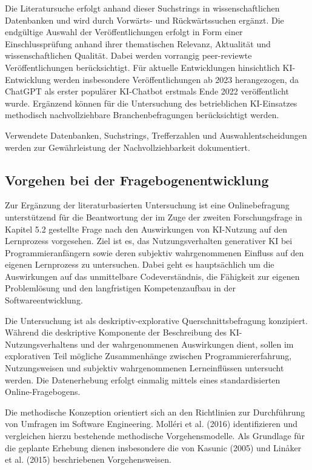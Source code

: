 Die Literatursuche erfolgt anhand dieser Suchstrings in wissenschaftlichen Datenbanken und wird durch Vorwärts- und Rückwärtssuchen ergänzt. Die endgültige Auswahl der Veröffentlichungen erfolgt in Form einer Einschlussprüfung anhand ihrer thematischen Relevanz, Aktualität und wissenschaftlichen Qualität. Dabei werden vorrangig peer-reviewte Veröffentlichungen berücksichtigt. Für aktuelle Entwicklungen hinsichtlich KI-Entwicklung werden insbesondere Veröffentlichungen ab 2023 herangezogen, da ChatGPT als erster populärer KI-Chatbot erstmals Ende 2022 veröffentlicht wurde. Ergänzend können für die Untersuchung des betrieblichen KI-Einsatzes methodisch nachvollziehbare Branchenbefragungen berücksichtigt werden.

Verwendete Datenbanken, Suchstrings, Trefferzahlen und Auswahlentscheidungen werden zur Gewährleistung der Nachvollziehbarkeit dokumentiert.

\subsection{Vorgehen bei der Fragebogenentwicklung}

Zur Ergänzung der literaturbasierten Untersuchung ist eine Onlinebefragung unterstützend für die Beantwortung der im Zuge der zweiten Forschungsfrage in Kapitel 5.2 gestellte Frage nach den Auswirkungen von KI-Nutzung auf den Lernprozess vorgesehen. 
Ziel ist es, das Nutzungsverhalten generativer KI bei Programmieranfängern sowie deren subjektiv wahrgenommenen Einfluss auf den eigenen Lernprozess zu untersuchen. Dabei geht es hauptsächlich um die Auswirkungen auf das unmittelbare Codeverständnis, die Fähigkeit zur eigenen Problemlösung und den langfristigen Kompetenzaufbau in der Softwareentwicklung.

Die Untersuchung ist als deskriptiv-explorative Querschnittsbefragung konzipiert. Während die deskriptive Komponente der Beschreibung des KI-Nutzungsverhaltens und der wahrgenommenen Auswirkungen dient, sollen im explorativen Teil mögliche Zusammenhänge zwischen Programmiererfahrung, Nutzungsweisen und subjektiv wahrgenommenen Lerneinflüssen untersucht werden. Die Datenerhebung erfolgt einmalig mittels eines standardisierten Online-Fragebogens.

Die methodische Konzeption orientiert sich an den Richtlinien zur Durchführung von Umfragen im Software Engineering. Molléri et al. (2016) identifizieren und vergleichen hierzu bestehende methodische Vorgehensmodelle. Als Grundlage für die geplante Erhebung dienen insbesondere die von Kasunic (2005) und Linåker et al. (2015) beschriebenen Vorgehensweisen.

